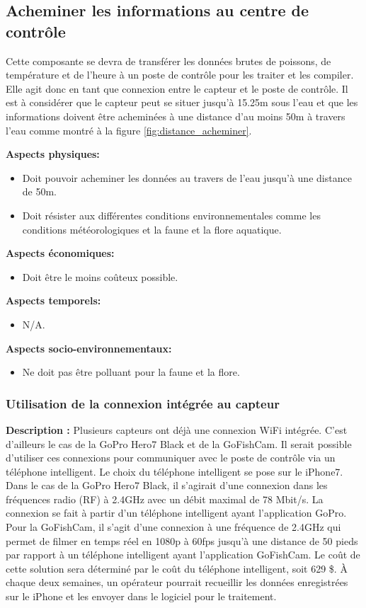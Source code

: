 \subsection{Acheminer les informations au centre de contrôle}
Cette composante se devra de transférer les données brutes de poissons, de température et de l'heure à un poste de contrôle pour les traiter et les compiler. Elle agit donc en tant que connexion entre le capteur et le poste de contrôle. Il est à considérer que le capteur peut se situer jusqu'à 15.25m sous l'eau et que les informations doivent être acheminées à une distance d'au moins 50m à travers l'eau comme montré à la figure \ref{fig:distance_acheminer}.

 \textbf{Aspects physiques:}
 \begin{itemize} [label = {--}]
    \item Doit pouvoir acheminer les données au travers de l'eau jusqu'à une distance de 50m.
    \item Doit résister aux différentes conditions environnementales comme les conditions météorologiques et la faune et la flore aquatique.
\end{itemize}

 \textbf{Aspects économiques:}
 \begin{itemize} [label = {--}]
    \item Doit être le moins coûteux possible.
\end{itemize}

 \textbf{Aspects temporels:}
 \begin{itemize} [label = {--}]
    \item N/A.
\end{itemize}

 \textbf{Aspects socio-environnementaux:}
 \begin{itemize} [label = {--}]
    \item Ne doit pas être polluant pour la faune et la flore.
\end{itemize}

\subsubsection{Utilisation de la connexion intégrée au capteur}
\textbf{Description :} Plusieurs capteurs ont déjà une connexion WiFi intégrée. C'est d'ailleurs le cas de la GoPro Hero7 Black et de la GoFishCam. Il serait possible d'utiliser ces connexions pour communiquer avec le poste de contrôle via un téléphone intelligent. Le choix du téléphone intelligent se pose sur le iPhone7. Dans le cas de la GoPro Hero7 Black, il s'agirait d'une connexion dans les fréquences radio (RF) à 2.4GHz avec un débit maximal de 78 Mbit/s. La connexion se fait à partir d'un téléphone intelligent ayant l'application GoPro. Pour la GoFishCam, il s'agit d'une connexion à une fréquence de 2.4GHz qui permet de filmer en temps réel en 1080p à 60fps jusqu'à une distance de 50 pieds par rapport à un téléphone intelligent ayant l'application GoFishCam. Le coût de cette solution sera déterminé par le coût du téléphone intelligent, soit 629 \$. À chaque deux semaines, un opérateur pourrait recueillir les données enregistrées sur le iPhone et les envoyer dans le logiciel pour le traitement.
 
